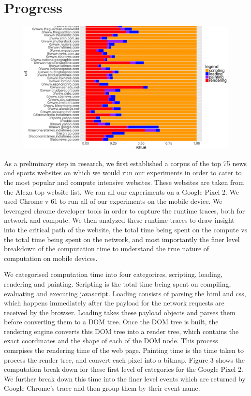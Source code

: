 \section{Progress}
\label{sec:Progress}


\begin{figure}[t!]
\centering
\includegraphics[width=0.99\columnwidth, scale=2.0]{figs/comp_1.png}
\label{fig:act_p2}
\end{figure}

As a preliminary step in research, we first established a corpus of the top
75 news and sports websites on which we would run our experiments
in order to cater to the most popular and compute intensive websites. 
These websites are taken from the Alexa top website list.
We ran all our experiments on a Google Pixel 2. We used Chrome v 61 to run all of our experiments on the mobile device. We leveraged chrome developer tools in order
to capture the runtime traces, both for network and compute. We then analyzed these runtime
traces to draw insight into the critical path of the website, the total time being spent on the 
compute vs the total time being spent on the network, and most importantly the finer
level breakdown of the computation time to understand the true nature of computation on mobile
devices. 

We categorised computation time into four categorires, scripting, loading, rendering and
painting. Scripting is the total time being spent on
compiling, evaluating and executing javascript. Loading consists of parsing the html and css, which happens 
immediately after the payload for the network requests are received by the browser. Loading
takes these payload objects and parses them before converting them to a DOM tree. Once the DOM tree is built,
the rendering engine converts this DOM tree into a render tree, which contains the
exact coordinates and the shape of each of the DOM node. This process comrpises the rendering time of the web page.
Painting time is the time taken to process the render tree, and convert
each pixel into a bitmap.
Figure 3 shows the computation break down for these first level of categories
for the Google Pixel 2. We further break down this time into the finer level events
which are returned by Google Chrome's trace and then group them by their event name.

